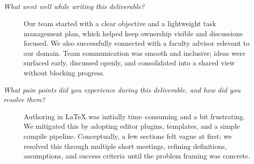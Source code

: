 \documentclass{article}
\begin{document}
\subsection*{\color{blue}{Xiaotian Lou}}
\begin{description}
  \item[\textit{What went well while writing this deliverable?}]
  Our team started with a clear objective and a lightweight task
  management plan, which helped keep ownership visible and discussions
  focused. We also successfully connected with a faculty advisor relevant
  to our domain. Team communication was smooth and inclusive; ideas were
  surfaced early, discussed openly, and consolidated into a shared view
  without blocking progress.

  \item[\textit{What pain points did you experience during this deliverable, and how did you resolve them?}]
  Authoring in \LaTeX{} was initially time--consuming and a bit
  frustrating. We mitigated this by adopting editor plugins, templates,
  and a simple compile pipeline. Conceptually, a few sections felt vague
  at first; we resolved this through multiple short meetings, refining
  definitions, assumptions, and success criteria until the problem
  framing was concrete.

\end{description}




\end{document}

